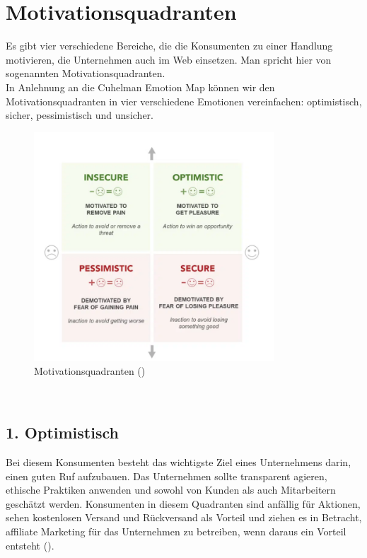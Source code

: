 \documentclass[./dokumentation.tex]{subfiles}
\begin{document}
\section{Motivationsquadranten}
Es gibt vier verschiedene Bereiche, die die Konsumenten zu einer Handlung motivieren, die Unternehmen auch im Web einsetzen. Man spricht hier von sogenannten Motivationsquadranten. \\
In Anlehnung an die Cuhelman Emotion Map können wir den Motivationsquadranten in vier verschiedene Emotionen vereinfachen: optimistisch, sicher, pessimistisch und unsicher. \\

\begin{figure}[H]
    \centering
    \includegraphics[width=0.8\textwidth]{bilder/motivationsquadranten.png}
    \caption{Motivationsquadranten (\cite{designbro})}
    \label{fig9:motivationsquadranten}
\end{figure}\\

\subsection{1. Optimistisch}
Bei diesem Konsumenten besteht das wichtigste Ziel eines Unternehmens darin, einen guten Ruf aufzubauen. Das Unternehmen sollte transparent agieren, ethische Praktiken anwenden und sowohl von Kunden als auch Mitarbeitern geschätzt werden. Konsumenten in diesem Quadranten sind anfällig für Aktionen, sehen kostenlosen Versand und Rückversand als Vorteil und ziehen es in Betracht, affiliate Marketing für das Unternehmen zu betreiben, wenn daraus ein Vorteil entsteht (\cite{designbro}). \\
 
\end{document}
